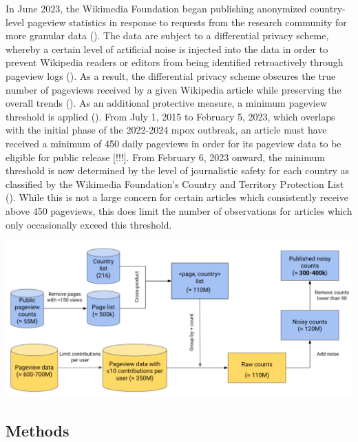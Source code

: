 \documentclass[
  12pt,
]{article}
\begin{document}
In June 2023, the Wikimedia Foundation began publishing anonymized
country-level pageview statistics in response to requests from the
research community for more granular data
(). The data are
subject to a differential privacy scheme, whereby a certain level of
artificial noise is injected into the data in order to prevent Wikipedia
readers or editors from being identified retroactively through pageview
logs (). As a result,
the differential privacy scheme obscures the true number of pageviews
received by a given Wikipedia article while preserving the overall
trends (). As an
additional protective measure, a minimum pageview threshold is applied
(). From July 1, 2015
to February 5, 2023, which overlaps with the initial phase of the
2022-2024 mpox outbreak, an article must have received a minimum of 450
daily pageviews in order for its pageview data to be eligible for public
release {[}!!!{]}. From February 6, 2023 onward, the minimum threshold
is now determined by the level of journalistic safety for each country
as classified by the Wikimedia Foundation's Country and Territory
Protection List (). While this is not a large
concern for certain articles which consistently receive above 450
pageviews, this does limit the number of observations for articles which
only occasionally exceed this threshold.

\begin{center}
\includegraphics{images/wiki-pageview-differential-privacy-pipeline.jpg}
\end{center}

\subsection{Methods}\label{methods}
\end{document}
